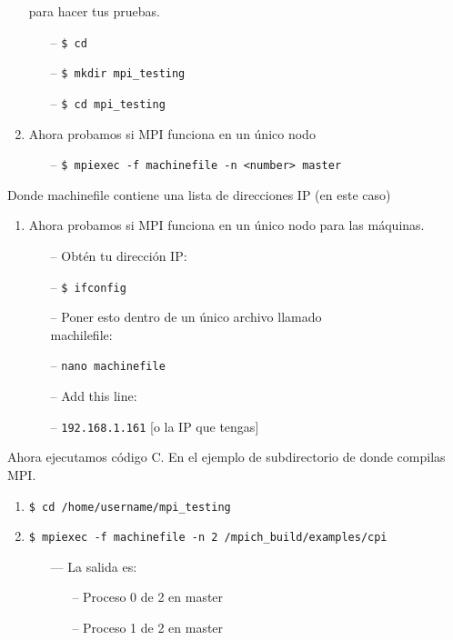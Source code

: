 \documentclass[conference]{IEEEtran}
\begin{document}
\begin{enumerate}
para hacer tus pruebas.
  \begin{itemize}
  \item[--] \texttt{\$ cd \texttildelow}
  \item[--] \texttt{\$ mkdir mpi\_testing}
  \item[--] \texttt{\$ cd mpi\_testing}
  \end{itemize}
\item Ahora probamos si MPI funciona en un único nodo
  \begin{itemize}
  \item[--] \texttt{\$ mpiexec -f machinefile -n <number> master}
  \end{itemize}
\end{enumerate}
Donde machinefile contiene una lista de direcciones IP (en este caso)
\begin{enumerate}[resume]
\item Ahora probamos si MPI funciona en un único nodo para las máquinas.
  \begin{itemize}
  \item[--] Obtén tu dirección IP:
  \item[--] \texttt{\$ ifconfig}
  \item[--] Poner esto dentro de un único archivo llamado\\machilefile:
  \item[--] \texttt{nano machinefile}
  \item[--] Add this line:
  \item[--] \texttt{192.168.1.161} [o la IP que tengas]
  \end{itemize}
\end{enumerate}
Ahora ejecutamos código C. En el ejemplo de subdirectorio de donde
compilas MPI.
\begin{enumerate}[resume]
\item \texttt{\$ cd /home/username/mpi\_testing}
\item \texttt{\$ mpiexec -f machinefile -n 2 \texttildelow/mpich\_build/examples/cpi}
  \begin{itemize}
    \item[---] La salida es:
    \begin{itemize}
      \item[--] Proceso 0 de 2 en master
      \item[--] Proceso 1 de 2 en master
    \end{itemize}
  \end{itemize}
\end{enumerate}
\end{document}
